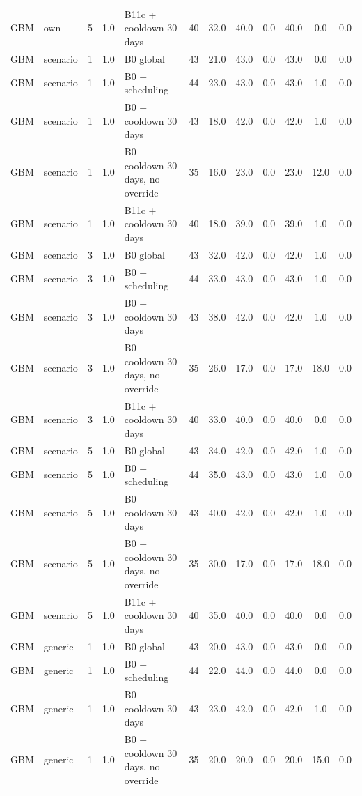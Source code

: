 \documentclass[10pt,onecolumn,letterpaper]{article}
\begin{document}
\begin{longtable}{lllllccccccc}
GBM & own & 5 & 1.0 & B11c + cooldown 30 days & 40 & 32.0 & 40.0 & 0.0 & 40.0 & 0.0 & 0.0 \\
GBM & scenario & 1 & 1.0 & B0 global & 43 & 21.0 & 43.0 & 0.0 & 43.0 & 0.0 & 0.0 \\
GBM & scenario & 1 & 1.0 & B0 + scheduling & 44 & 23.0 & 43.0 & 0.0 & 43.0 & 1.0 & 0.0 \\
GBM & scenario & 1 & 1.0 & B0 + cooldown 30 days & 43 & 18.0 & 42.0 & 0.0 & 42.0 & 1.0 & 0.0 \\
GBM & scenario & 1 & 1.0 & B0 + cooldown 30 days, no override & 35 & 16.0 & 23.0 & 0.0 & 23.0 & 12.0 & 0.0 \\
GBM & scenario & 1 & 1.0 & B11c + cooldown 30 days & 40 & 18.0 & 39.0 & 0.0 & 39.0 & 1.0 & 0.0 \\
GBM & scenario & 3 & 1.0 & B0 global & 43 & 32.0 & 42.0 & 0.0 & 42.0 & 1.0 & 0.0 \\
GBM & scenario & 3 & 1.0 & B0 + scheduling & 44 & 33.0 & 43.0 & 0.0 & 43.0 & 1.0 & 0.0 \\
GBM & scenario & 3 & 1.0 & B0 + cooldown 30 days & 43 & 38.0 & 42.0 & 0.0 & 42.0 & 1.0 & 0.0 \\
GBM & scenario & 3 & 1.0 & B0 + cooldown 30 days, no override & 35 & 26.0 & 17.0 & 0.0 & 17.0 & 18.0 & 0.0 \\
GBM & scenario & 3 & 1.0 & B11c + cooldown 30 days & 40 & 33.0 & 40.0 & 0.0 & 40.0 & 0.0 & 0.0 \\
GBM & scenario & 5 & 1.0 & B0 global & 43 & 34.0 & 42.0 & 0.0 & 42.0 & 1.0 & 0.0 \\
GBM & scenario & 5 & 1.0 & B0 + scheduling & 44 & 35.0 & 43.0 & 0.0 & 43.0 & 1.0 & 0.0 \\
GBM & scenario & 5 & 1.0 & B0 + cooldown 30 days & 43 & 40.0 & 42.0 & 0.0 & 42.0 & 1.0 & 0.0 \\
GBM & scenario & 5 & 1.0 & B0 + cooldown 30 days, no override & 35 & 30.0 & 17.0 & 0.0 & 17.0 & 18.0 & 0.0 \\
GBM & scenario & 5 & 1.0 & B11c + cooldown 30 days & 40 & 35.0 & 40.0 & 0.0 & 40.0 & 0.0 & 0.0 \\
GBM & generic & 1 & 1.0 & B0 global & 43 & 20.0 & 43.0 & 0.0 & 43.0 & 0.0 & 0.0 \\
GBM & generic & 1 & 1.0 & B0 + scheduling & 44 & 22.0 & 44.0 & 0.0 & 44.0 & 0.0 & 0.0 \\
GBM & generic & 1 & 1.0 & B0 + cooldown 30 days & 43 & 23.0 & 42.0 & 0.0 & 42.0 & 1.0 & 0.0 \\
GBM & generic & 1 & 1.0 & B0 + cooldown 30 days, no override & 35 & 20.0 & 20.0 & 0.0 & 20.0 & 15.0 & 0.0 \\

\end{longtable}
\end{document}
